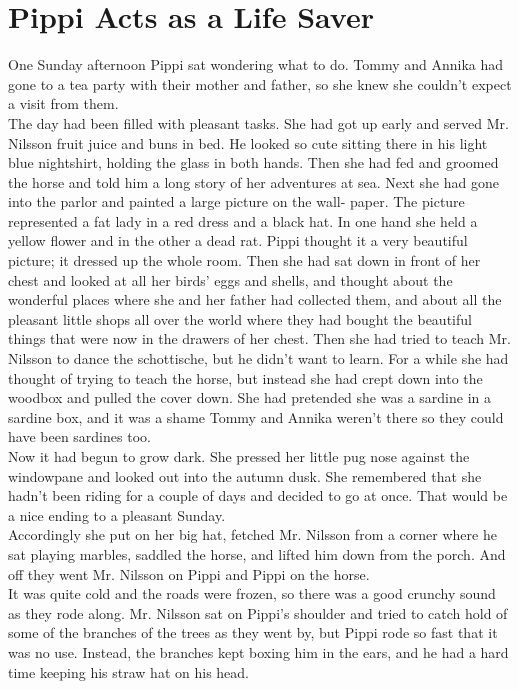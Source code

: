 \documentclass{standard}
\begin{document}
\section{Pippi Acts as a Life Saver}
One Sunday afternoon Pippi sat wondering what to do. Tommy and Annika had gone to a tea party with their mother and father, so she knew she couldn’t expect a visit from them.\\

The day had been filled with pleasant tasks. She had got up early and served Mr. Nilsson fruit juice and buns in bed. He looked so cute sitting there in his light blue nightshirt, holding the glass in both hands. Then she had fed and groomed the horse and told him a long story of her adventures at sea. Next she had gone into the parlor and painted a large picture on the wall- paper. The picture represented a fat lady in a red dress and a black hat. In one hand she held a yellow flower and in the other a dead rat. Pippi thought it a very beautiful picture; it dressed up the whole room. Then she had sat down in front of her chest and looked at all her birds’ eggs and shells, and thought about the wonderful places where she and her father had collected them, and about all the pleasant little shops all over the world where they had bought the beautiful things that were now in the drawers of her chest. Then she had tried to teach Mr. Nilsson to dance the schottische, but he didn’t want to learn. For a while she had thought of trying to teach the horse, but instead she had crept down into the woodbox and pulled the cover down. She had pretended she was a sardine in a sardine box, and it was a shame Tommy and Annika weren’t there so they could have been sardines too.\\

Now it had begun to grow dark. She pressed her little pug nose against the windowpane and looked out into the autumn dusk. She remembered that she hadn’t been riding for a couple of days and decided to go at once. That would be a nice ending to a pleasant Sunday.\\

Accordingly she put on her big hat, fetched Mr. Nilsson from a corner where he sat playing marbles, saddled the horse, and lifted him down from the porch. And off they went Mr. Nilsson on Pippi and Pippi on the horse.\\

It was quite cold and the roads were frozen, so there was a good crunchy sound as they rode along. Mr. Nilsson sat on Pippi’s shoulder and tried to catch hold of some of the branches of the trees as they went by, but Pippi rode so fast that it was no use. Instead, the branches kept boxing him in the ears, and he had a hard time keeping his straw hat on his head.\\
\end{document}

